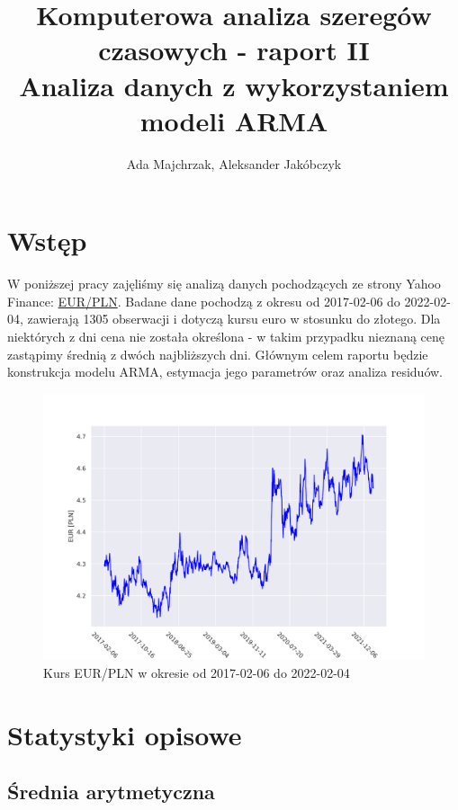 \documentclass[fleqn]{article}
\author{Ada Majchrzak, Aleksander Jakóbczyk}
\title{Komputerowa analiza szeregów czasowych - raport II \\[1ex] \large Analiza danych z wykorzystaniem modeli ARMA}
\theoremstyle{plain}
\begin{document}
    \maketitle

    \section{Wstęp}
    W poniższej pracy zajęliśmy się analizą danych pochodzących ze strony Yahoo Finance:
    \href{https://finance.yahoo.com/quote/EURPLN%3DX/history?p=EURPLN%3DX}{\color{blue} EUR/PLN}. Badane dane pochodzą z okresu od 2017-02-06 do 2022-02-04, zawierają 1305 obserwacji i dotyczą
    kursu euro w stosunku do złotego. Dla niektórych z dni cena nie została określona - w takim przypadku nieznaną cenę zastąpimy średnią z dwóch najbliższych dni.
    Głównym celem raportu będzie konstrukcja modelu ARMA, estymacja jego parametrów oraz analiza residuów. 
    \begin{figure}[H]
        \centering
        \includegraphics[width=1\textwidth]{data.png}
        \caption{Kurs EUR/PLN w okresie od 2017-02-06 do 2022-02-04}
        \label{fig:dane}
    \end{figure}

    \clearpage

    \section{Statystyki opisowe}

    \subsection{Średnia arytmetyczna}
\end{document}
